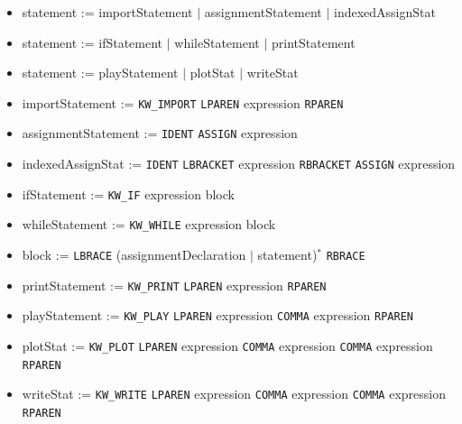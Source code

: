 \begin{itemize}
	\item statement := importStatement $|$ assignmentStatement $|$ indexedAssignStat
	\item statement := ifStatement $|$ whileStatement $|$ printStatement
	\item statement := playStatement $|$ plotStat $|$ writeStat
	\item importStatement := \texttt{KW\_IMPORT} \texttt{LPAREN} expression \texttt{RPAREN}
	\item assignmentStatement := \texttt{IDENT} \texttt{ASSIGN} expression
	\item indexedAssignStat := \texttt{IDENT} \texttt{LBRACKET} expression \texttt{RBRACKET} \texttt{ASSIGN} expression
	\item ifStatement := \texttt{KW\_IF} expression block
	\item whileStatement := \texttt{KW\_WHILE} expression block
	\item block := \texttt{LBRACE} (assignmentDeclaration $|$ statement)$^*$ \texttt{RBRACE}
	\item printStatement := \texttt{KW\_PRINT} \texttt{LPAREN} expression \texttt{RPAREN}
	\item playStatement := \texttt{KW\_PLAY} \texttt{LPAREN} expression \texttt{COMMA} expression \texttt{RPAREN}
	\item plotStat := \texttt{KW\_PLOT} \texttt{LPAREN} expression \texttt{COMMA} expression \texttt{COMMA} expression \texttt{RPAREN}
	\item writeStat := \texttt{KW\_WRITE} \texttt{LPAREN} expression \texttt{COMMA} expression \texttt{COMMA} expression \texttt{RPAREN}
\end{itemize}

